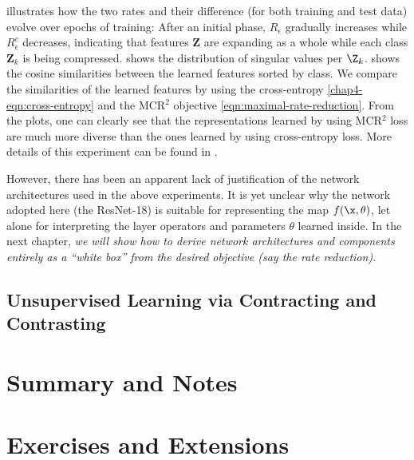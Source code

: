 \documentclass[../../book-main.tex]{subfiles}
\begin{document}
	 illustrates how the two rates and their difference (for both training and test data) evolve over epochs of training: After an initial phase, $R_\epsilon$ gradually increases while $R^c_\epsilon$ decreases, indicating that features $\bm Z$ are expanding as a whole while each class $\bm Z_k$ is being compressed.
	 shows the distribution of singular values per $\Z_k$.  shows the cosine similarities between the learned features sorted by class. We compare the similarities of the learned features by using the cross-entropy \eqref{chap4-eqn:cross-entropy} and the MCR$^2$ objective \eqref{eqn:maximal-rate-reduction}. From the plots, one can clearly see that the representations learned by using MCR$^2$ loss are much more diverse than the ones learned by using cross-entropy loss. More details of this experiment can be found in \cite{chan2021redunet}.
	\label{eg:Rate-Reduction-CIFAR10}


However, there has been an apparent lack of justification of the network architectures used in the above experiments. It is yet unclear why the network adopted here (the ResNet-18) is suitable for representing the map $f(\x, \theta)$, let alone for interpreting the layer operators and parameters $\theta$ learned inside. In the next chapter, {\em we will show how to derive network architectures and components entirely as a ``white box'' from the desired objective (say the rate reduction)}.

\subsection{Unsupervised Learning via Contracting and Contrasting}

\section{Summary and Notes}







\section{Exercises and Extensions}
\end{document}
